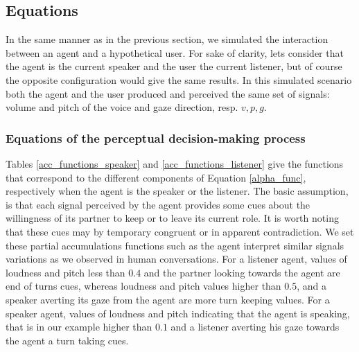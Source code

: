 
 
\subsection{Equations}

In the same manner as in the previous section, we simulated the interaction between an agent and a hypothetical user. For sake of clarity, lets consider that the agent is the current speaker and the user the current listener, but of course the opposite configuration would give the same results. In this simulated scenario both the agent and the user produced and perceived the same set of signals: volume and pitch of the voice and gaze direction, resp. $v,p,g$.

\subsubsection{Equations of the perceptual decision-making process}

Tables \ref{acc_functions_speaker} and \ref{acc_functions_listener} give the functions that correspond to the different components of Equation \ref{alpha_func}, respectively when the agent is the speaker or the listener. 
The basic assumption, is that each signal perceived by the agent provides some cues about the willingness of its partner to keep or to leave its current role. It is worth noting that these cues may by temporary congruent or in apparent contradiction.
We set these partial accumulations functions such as the agent interpret similar signals variations as we observed in human conversations. For a listener agent, values of loudness and pitch less than $0.4$ and the partner looking towards the agent are end of turns cues, whereas loudness and pitch values higher than $0.5$, and a speaker averting its gaze from the agent are more turn keeping values. For a speaker agent, values of loudness and pitch indicating that the agent is speaking, that is in our example higher than $0.1$ and a listener averting his gaze towards the agent a turn taking cues.

